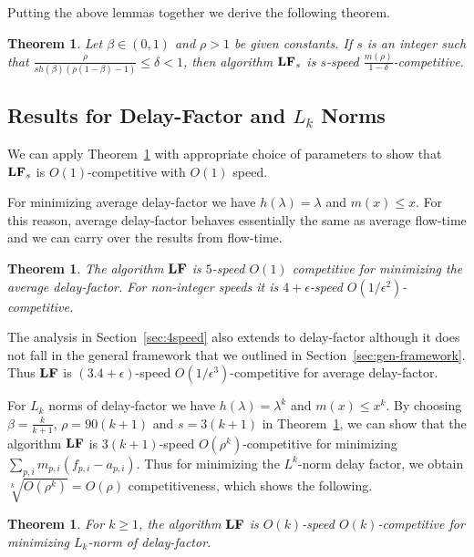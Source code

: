 \documentclass[11pt]{article}
\newtheorem{theorem}[lemma]{Theorem}
\newcommand{\eps}{\epsilon}
\newcommand{\grdy}{\Algorithm{LF}}
\newcommand{\len}{\mathfrak{\rho}}
\begin{document}
\begin{titlepage}
Putting the above lemmas together we derive the following theorem.

\begin{theorem}
    \label{thm:G}
    Let $\beta \in (0,1)$ and $\len > 1$ be given constants.  If $s$
    is an integer such that $\frac{ \len }{sh(\beta)(\len(1-\beta) -1)} \le \delta < 1$, then algorithm $\grdy_s$ is $s$-speed
    $\frac{m(\len)}{1-\delta}$-competitive.
\vspace{-2.5mm}
\end{theorem}


\subsection{Results for Delay-Factor and $L_k$ Norms}
\label{sec:metric-results} \vspace{-0.5mm}

We can apply Theorem~\ref{thm:G} with appropriate choice of parameters
to show that $\grdy_s$ is $O(1)$-competitive with $O(1)$ speed.

For minimizing average delay-factor we have $h(\lambda) = \lambda$ and
$m(x) \le x$. For this reason, average delay-factor behaves essentially
the same as average flow-time and we can carry over the results
from flow-time.

\begin{theorem}
  \label{thm:df_34spd}
  The algorithm $\grdy$ is $5$-speed $O(1)$
  competitive for minimizing the average delay-factor. For non-integer speeds
  it is $4+\eps$-speed $O(1/\eps^2)$-competitive.
\end{theorem}

The analysis in Section~\ref{sec:4speed} also extends to delay-factor although it does not fall in the general
framework that we outlined in Section~\ref{sec:gen-framework}. Thus $\grdy$ is $(3.4+\eps)$-speed
$O(1/\eps^3)$-competitive for average delay-factor.

For $L_k$ norms of delay-factor we have $h(\lambda) = \lambda^k$ and $m(x) \le x^k$. By choosing $\beta =
\frac{k}{k+1}$, $\rho = 90(k+1)$ and $s = 3(k+1)$ in Theorem~\ref{thm:G}, we can show that
the algorithm $\grdy$ is $3(k+1)$-speed $O(\rho^k)$-competitive for minimizing $\sum_{p,i} m_{p,i}(f_{p,i}-a_{p,i})$.
Thus for minimizing the $L^k$-norm delay factor, we obtain  $\sqrt[k]{O(\rho^k)} = O(\rho)$ competitiveness, which shows the following.


\begin{theorem}
    \label{thm:LP}
    For $k \ge 1$, the algorithm $\grdy$ is $O(k)$-speed
    $O(k)$-competitive for minimizing $L_k$-norm of delay-factor.
\end{theorem}


\end{titlepage}
\end{document}
